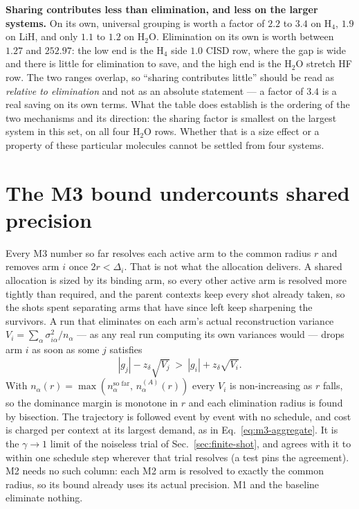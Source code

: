 \documentclass[10pt]{article}
\begin{document}
\textbf{Sharing contributes less than elimination, and less on the larger
systems.} On its own, universal grouping is worth a factor of $2.2$ to $3.4$ on
H$_4$, $1.9$ on LiH, and only $1.1$ to $1.2$ on H$_2$O. Elimination on its own is
worth between $1.27$ and $252.97$: the low end is the H$_4$ side $1.0$ CISD row,
where the gap is wide and there is little for elimination to save, and the high
end is the H$_2$O stretch HF row. The two ranges overlap, so ``sharing contributes
little'' should be read as \emph{relative to elimination} and not as an absolute
statement --- a factor of $3.4$ is a real saving on its own terms. What the table
does establish is the ordering of the two mechanisms and its direction: the
sharing factor is smallest on the largest system in this set, on all four H$_2$O
rows. Whether that is a size effect or a property of these particular molecules
cannot be settled from four systems.

\section{The M3 bound undercounts shared precision}
\label{sec:spillover}

Every M3 number so far resolves each active arm to the common radius $r$ and
removes arm $i$ once $2r<\Delta_i$. That is not what the allocation delivers. A
shared allocation is sized by its binding arm, so every other active arm is
resolved more tightly than required, and the parent contexts keep every shot
already taken, so the shots spent separating arms that have since left keep
sharpening the survivors. A run that eliminates on each arm's actual
reconstruction variance $V_i=\sum_\alpha\sigma_{i\alpha}^2/n_\alpha$ --- as any
real run computing its own variances would --- drops arm $i$ as soon as some $j$
satisfies
\begin{equation}
  |g_j|-z_\delta\sqrt{V_j}\ >\ |g_i|+z_\delta\sqrt{V_i} .
  \label{eq:actual}
\end{equation}
With $n_\alpha(r)=\max\!\left(n_\alpha^{\text{so far}},\,n_\alpha^{(A)}(r)\right)$
every $V_i$ is non-increasing as $r$ falls, so the dominance margin is monotone in
$r$ and each elimination radius is found by bisection. The trajectory is followed
event by event with no schedule, and cost is charged per context at its largest
demand, as in Eq.~\eqref{eq:m3-aggregate}. It is the $\gamma\to1$ limit of the
noiseless trial of Sec.~\ref{sec:finite-shot}, and agrees with it to within one
schedule step wherever that trial resolves (a test pins the agreement). M2 needs no
such column: each M2 arm is resolved to exactly the common radius, so its bound
already uses its actual precision. M1 and the baseline eliminate nothing.
\end{document}
